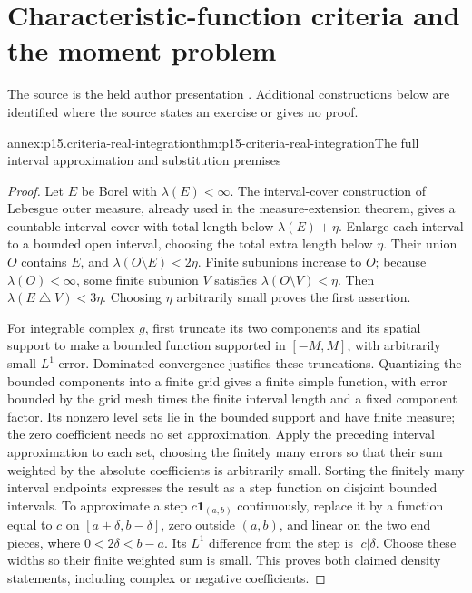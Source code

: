\section{Characteristic-function criteria and the moment problem}
\label{sec:annex-p15-characteristic-function-criteria-and-moments}

The source is the held author presentation
\cite[pp.~131--143]{DurrettPTEAuthor2019}.
Additional constructions below are identified where the source
states an exercise or gives no proof.

\begin{annexitem}{annex:p15.criteria-real-integration}{thm:p15-criteria-real-integration}{The full interval approximation and substitution premises}
\begin{proof}
Let \(E\) be Borel with \(\lambda(E)<\infty\).
The interval-cover construction of Lebesgue outer measure,
already used in the measure-extension theorem, gives a
countable interval cover with total length below
\(\lambda(E)+\eta\). Enlarge each interval to a bounded
open interval, choosing the total extra length below \(\eta\).
Their union \(O\) contains \(E\), and
\(\lambda(O\setminus E)<2\eta\).
Finite subunions increase to \(O\); because \(\lambda(O)<\infty\),
some finite subunion \(V\) satisfies
\(\lambda(O\setminus V)<\eta\).
Then \(\lambda(E\mathbin{\triangle}V)<3\eta\).
Choosing \(\eta\) arbitrarily small proves the first assertion.

For integrable complex \(g\), first truncate its two components
and its spatial support to make a bounded function supported
in \([-M,M]\), with arbitrarily small \(L^1\) error.
Dominated convergence justifies these truncations.
Quantizing the bounded components into a finite grid gives
a finite simple function, with error bounded by the grid
mesh times the finite interval length and a fixed component
factor. Its nonzero level sets lie in the bounded support
and have finite measure; the zero coefficient needs no set approximation.
Apply the preceding interval approximation to each set,
choosing the finitely many errors so that their sum weighted
by the absolute coefficients is arbitrarily small.
Sorting the finitely many interval endpoints expresses the
result as a step function on disjoint bounded intervals.
To approximate a step \(c\mathbf1_{(a,b)}\) continuously,
replace it by a function equal to \(c\) on
\([a+\delta,b-\delta]\), zero outside \((a,b)\), and linear
on the two end pieces, where \(0<2\delta<b-a\).
Its \(L^1\) difference from the step is \(|c|\delta\).
Choose these widths so their finite weighted sum is small.
This proves both claimed density statements, including
complex or negative coefficients.


\end{proof}
\end{annexitem}

